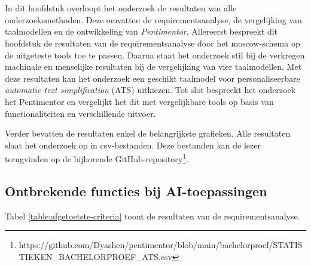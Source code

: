 \chapter{}%
\label{ch:resultaten}

In dit hoofdstuk overloopt het onderzoek de resultaten van alle onderzoeksmethoden. Deze omvatten de requirementsanalyse, de vergelijking van taalmodellen en de ontwikkeling van \textit{Pentimentor}. Allereerst bespreekt dit hoofdstuk de resultaten van de requirementsanalyse door het moscow-schema op de uitgeteste tools toe te passen. Daarna staat het onderzoek stil bij de verkregen machinale en menselijke resultaten bij de vergelijking van vier taalmodellen. Met deze resultaten kan het onderzoek een geschikt taalmodel voor personaliseerbare \textit{automatic text simplification} (ATS) uitkiezen. Tot slot bespreekt het onderzoek het Pentimentor en vergelijkt het dit met vergelijkbare tools op basis van functionaliteiten en verschillende uitvoer. 

\medspace

Verder bevatten de resultaten enkel de belangrijkste grafieken. Alle resultaten slaat het onderzoek op in csv-bestanden. Deze bestanden kan de lezer terugvinden op de bijhorende GitHub-repository\footnote{https://github.com/Dyashen/pentimentor/blob/main/bachelorproef/STATISTIEKEN\_BACHELORPROEF\_ATS.csv}.

\section{Ontbrekende functies bij AI-toepassingen}

Tabel \ref{table:afgetoetste-criteria} toont de resultaten van de requirementsanalyse.

